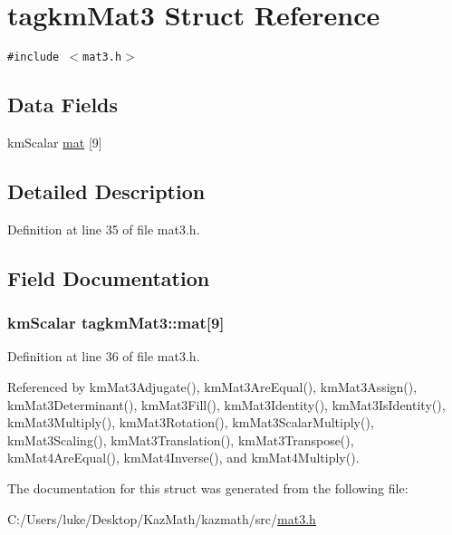\hypertarget{structtagkm_mat3}{
\section{tagkmMat3 Struct Reference}
\label{structtagkm_mat3}
}
{\tt \#include $<$mat3.h$>$}

\subsection*{Data Fields}
\begin{CompactItemize}
\item 
kmScalar \hyperlink{structtagkm_mat3_ac23f88b2167a10907728e8f216788e0}{mat} \mbox{[}9\mbox{]}
\end{CompactItemize}


\subsection{Detailed Description}


Definition at line 35 of file mat3.h.

\subsection{Field Documentation}
\hypertarget{structtagkm_mat3_ac23f88b2167a10907728e8f216788e0}{
\subsubsection[{mat}]{\setlength{\rightskip}{0pt plus 5cm}kmScalar {\bf tagkmMat3::mat}\mbox{[}9\mbox{]}}}
\label{structtagkm_mat3_ac23f88b2167a10907728e8f216788e0}




Definition at line 36 of file mat3.h.

Referenced by kmMat3Adjugate(), kmMat3AreEqual(), kmMat3Assign(), kmMat3Determinant(), kmMat3Fill(), kmMat3Identity(), kmMat3IsIdentity(), kmMat3Multiply(), kmMat3Rotation(), kmMat3ScalarMultiply(), kmMat3Scaling(), kmMat3Translation(), kmMat3Transpose(), kmMat4AreEqual(), kmMat4Inverse(), and kmMat4Multiply().

The documentation for this struct was generated from the following file:\begin{CompactItemize}
\item 
C:/Users/luke/Desktop/KazMath/kazmath/src/\hyperlink{mat3_8h}{mat3.h}\end{CompactItemize}
